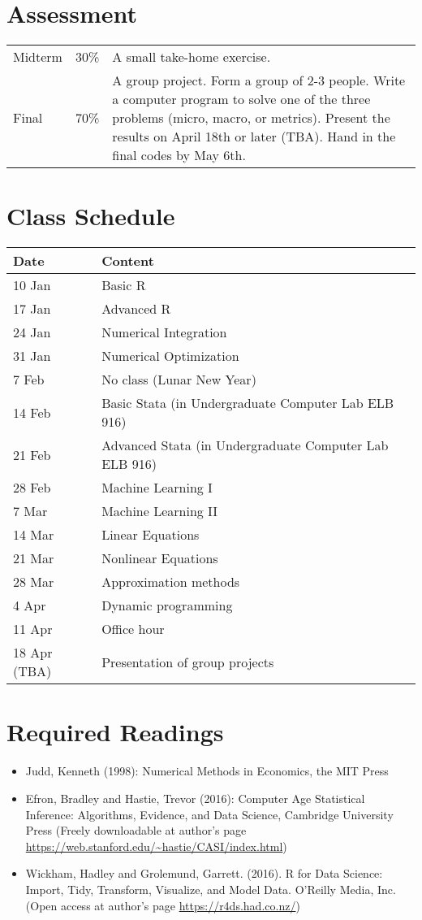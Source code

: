 \documentclass[11pt]{article}
\begin{document}
\section*{Assessment}
\begin{tabular}{p{0.5in}p{0.5in}p{5in}}
   Midterm & 30\% & A small take-home exercise. \\
   Final  & 70\%  & A group project. Form a group of 2-3 people. Write a computer program to solve one of the three problems (micro, macro, or metrics). Present the results on April 18th or later (TBA). Hand in the final codes by May 6th.
\end{tabular}

\section*{Class Schedule}
\begin{tabular}{p{1in}p{4in}}
  \hline
  Date & Content \\
  \hline
  10 Jan & Basic R \\
  17 Jan & Advanced R \\
  24 Jan & Numerical Integration  \\
  31 Jan & Numerical Optimization  \\
  7 Feb & No class (Lunar New Year)\\
  14 Feb & Basic Stata (in Undergraduate Computer Lab ELB 916) \\
  21 Feb & Advanced Stata (in Undergraduate Computer Lab ELB 916)\\
  28 Feb & Machine Learning I  \\
  7 Mar &  Machine Learning II \\
  14 Mar & Linear Equations \\
  21 Mar & Nonlinear Equations \\
  28 Mar & Approximation methods \\
  4 Apr & Dynamic programming \\
  11 Apr & Office hour \\
  18 Apr (TBA) & Presentation of group projects \\   
  \hline
\end{tabular}


\section*{Required Readings}
\begin{itemize}
\item Judd, Kenneth (1998): Numerical Methods in Economics, the MIT Press 
\item Efron, Bradley and Hastie, Trevor (2016): Computer Age Statistical Inference: Algorithms, Evidence, and Data Science, Cambridge University Press 
(Freely downloadable at author's page \url{https://web.stanford.edu/~hastie/CASI/index.html})
\item Wickham, Hadley and Grolemund, Garrett.  (2016). R for Data Science: Import, Tidy, Transform, Visualize, and Model Data. O’Reilly Media, Inc. (Open access at author's page \url{https://r4ds.had.co.nz/})


\end{itemize}
\end{document}
